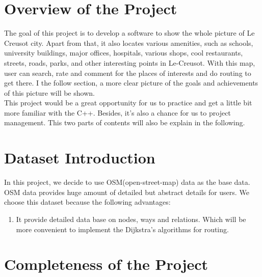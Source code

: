 \documentclass[a4paper, 12pt, english]{book}
\begin{document}
\section{Overview of the Project}


The goal of this project is to develop a software to show the whole picture of Le Creusot city. Apart from that, it also locates various amenities, such as schools, university buildings, major offices, hospitals, various shops, cool restaurants, streets, roads, parks, and other interesting points in Le-Creusot. With this map, user can search, rate and comment for the places of interests and do routing to get there. I the follow section, a more clear picture of the goals and achievements of this picture will be shown. \\

This project would be a great opportunity for us to practice and get a little bit more familiar with the C++. Besides, it's also a chance for us to project management. This two parts of contents will also be explain in the following.



\section{Dataset Introduction}

In this project, we decide to use OSM(open-street-map) data as the base data. OSM data provides huge amount of detailed but abstract details for users. We choose this dataset because the following advantages:

\begin{enumerate}
	\item  It provide detailed data base on nodes, ways and relations. Which will be more convenient to implement the Dijkstra's algorithms for routing.
\end{enumerate}

\section{Completeness of the Project}
\end{document}
